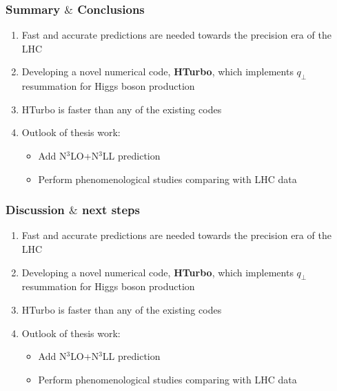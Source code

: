 \documentclass[aspectratio=43]{beamer}
\begin{document}
\begin{frame}
	
	\frametitle{Summary $\&$ Conclusions}
	
	\vspace{2.0 cm}
	
	\begin{enumerate}
		\item \footnotesize Fast and accurate predictions are needed towards the precision era of the LHC
		\item \footnotesize Developing a novel numerical code, \textbf{HTurbo}, which implements $q_{\perp}$ resummation for Higgs boson production
		\item \footnotesize HTurbo is {\color{blue} faster than any of the existing codes}
		\item \footnotesize Outlook of thesis work: 
		\begin{itemize}
			\item \footnotesize Add {\color{blue}N$^{3}$LO+N$^{3}$LL} prediction
			\item \footnotesize Perform phenomenological studies comparing with LHC data
		\end{itemize}
		
	\end{enumerate}

	\vspace{2.0 cm}

\end{frame}

\begin{frame}
	
	\frametitle{Discussion $\&$ next steps}

	\vspace{2.0 cm}
	
	\begin{enumerate}
		\item \footnotesize Fast and accurate predictions are needed towards the precision era of the LHC
		\item \footnotesize Developing a novel numerical code, \textbf{HTurbo}, which implements $q_{\perp}$ resummation for Higgs boson production
		\item \footnotesize HTurbo is {\color{blue} faster than any of the existing codes}
		\item \footnotesize Outlook of thesis work: 
		\begin{itemize}
			\item \footnotesize Add {\color{blue}N$^{3}$LO+N$^{3}$LL} prediction
			\item \footnotesize Perform phenomenological studies comparing with LHC data
		\end{itemize}

	\end{enumerate}

	\vspace{2.0 cm}

\end{frame}
\end{document}
